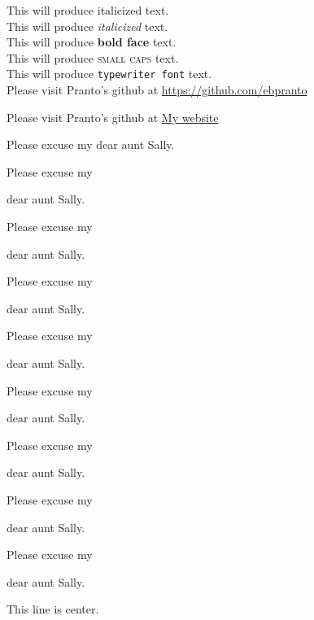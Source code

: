 \documentclass[11pt]{article}
\begin{document}
This will produce italicized text.\\
This will produce \textit{italicized} text.\\
This will produce \textbf{bold face} text.\\
This will produce \textsc{small caps} text.\\
This will produce \texttt{typewriter font} text.\\
Please visit Pranto's github at \url{https://github.com/ebpranto}

Please visit Pranto's github at \href{https://github.com/ebpranto}{My website}  %

\vspace{1cm}

Please excuse my dear aunt Sally.

Please excuse my \begin{large}dear aunt Sally.\end{large}

Please excuse my \begin{Large}dear aunt Sally.\end{Large}

Please excuse my \begin{huge}dear aunt Sally.\end{huge}

Please excuse my \begin{Huge}dear aunt Sally.\end{Huge}

Please excuse my \begin{normalsize}dear aunt Sally.\end{normalsize}

Please excuse my \begin{small}dear aunt Sally.\end{small}


Please excuse my \begin{scriptsize}dear aunt Sally.\end{scriptsize}

Please excuse my \begin{tiny}dear aunt Sally.\end{tiny}

\vspace{1cm}

\begin{center}This line is center.\end{center}
\end{document}
